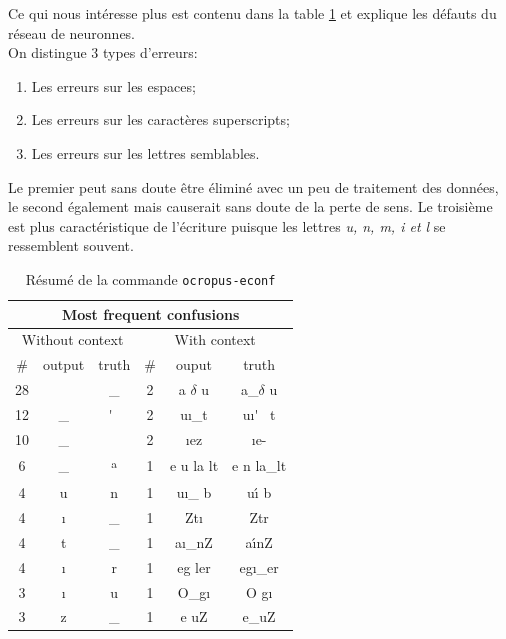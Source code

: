 \documentclass{article}
\newcommand\up{\textsuperscript}
\begin{document}
Ce qui nous intéresse plus est contenu dans la table \ref{t2} et explique les défauts du réseau de neuronnes. \\
On distingue 3 types d'erreurs:
\begin{enumerate}[parsep=0.1cm,itemsep=0.1cm,topsep=0.1cm]
    \item Les erreurs sur les espaces;
    \item Les erreurs sur les caractères superscripts;
    \item Les erreurs sur les lettres semblables. 
\end{enumerate}

\noindent Le premier peut sans doute être éliminé avec un peu de traitement des données, le second également mais causerait sans doute de la perte de sens. Le troisième est plus caractéristique de l'écriture puisque les lettres \textit{u, n, m, i et l} se ressemblent souvent.

\begin{table}[!h]
    \centering
    \begin{tabular}{|ccc|ccc|}
        \hline
        \multicolumn{6}{|c|}{\cellcolor[gray]{0.8} Most frequent confusions}                         \\ \hline
        \multicolumn{3}{|c|}{\cellcolor[gray]{0.9}Without context} & \multicolumn{3}{c|}{\cellcolor[gray]{0.9}With context} \\ \hline
        \#       & output       & truth       & \#   & ouput       & truth        \\ \hline
        28       &              &     \_      & 2    & a $\delta$ u  & a\_$\delta$ u        \\
        12       & \_           & \'~         & 2    & uı\_t        & uı\'~ t    \\
        10       & \_           &             & 2    & ıez         &  ıe-       \\
        6        & \_           & \up{a}      & 1    & e u la lt   & e n la\_lt   \\
        4        & u            & n           & 1    & uı\_ b      & u\'{ı} b        \\
        4        & ı            & \_          & 1    & Ztı         & Ztr         \\
        4        & t            & \_          & 1    & aı\_nZ      & a\'{ı}nZ        \\
        4        & ı            &  r          & 1    & eg ler      & egı\_er      \\
        3        & ı            & u           & 1    & O\_gı       & O gı         \\
        3        & z            & \_          & 1    & e uZ        & e\_uZ        \\ \hline
    \end{tabular}
    \caption{Résumé de la commande \texttt{ocropus-econf}}
    \label{t2}
\end{table}
\end{document}
